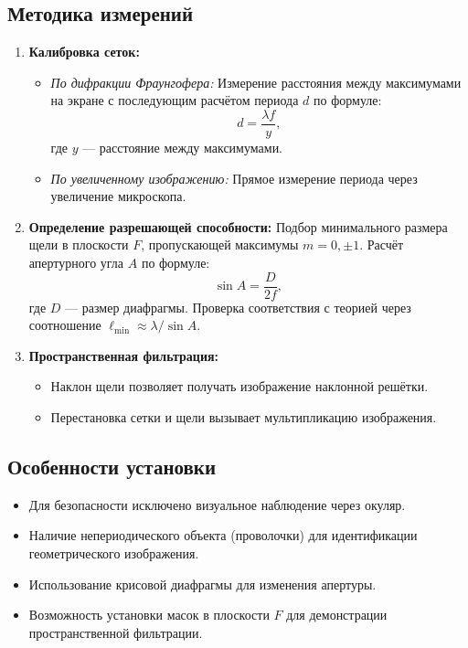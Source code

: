 \subsection*{Методика измерений}
\begin{enumerate}
    \item \textbf{Калибровка сеток:}
    \begin{itemize}
        \item \textit{По дифракции Фраунгофера:} Измерение расстояния между максимумами на экране с последующим расчётом периода \( d \) по формуле:
        \begin{equation}
            d = \frac{\lambda f}{y},
        \end{equation}
        где \( y \) --- расстояние между максимумами.
        \item \textit{По увеличенному изображению:} Прямое измерение периода через увеличение микроскопа.
    \end{itemize}
    
    \item \textbf{Определение разрешающей способности:}
    Подбор минимального размера щели в плоскости \( F \), пропускающей максимумы \( m = 0, \pm 1 \). Расчёт апертурного угла \( A \) по формуле:
    \begin{equation}
        \sin A = \frac{D}{2f},
    \end{equation}
    где \( D \) --- размер диафрагмы. Проверка соответствия с теорией через соотношение \( \ell_{\min} \approx \lambda / \sin A \).
    
    \item \textbf{Пространственная фильтрация:}
    \begin{itemize}
        \item Наклон щели позволяет получать изображение наклонной решётки.
        \item Перестановка сетки и щели вызывает мультипликацию изображения.
    \end{itemize}
\end{enumerate}

\subsection*{Особенности установки}
\begin{itemize}
    \item Для безопасности исключено визуальное наблюдение через окуляр.
    \item Наличие непериодического объекта (проволочки) для идентификации геометрического изображения.
    \item Использование крисовой диафрагмы для изменения апертуры.
    \item Возможность установки масок в плоскости \( F \) для демонстрации пространственной фильтрации.
\end{itemize}

